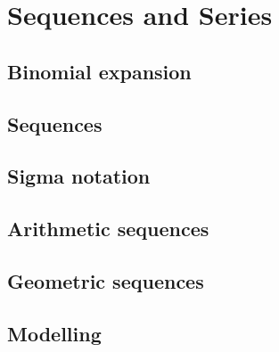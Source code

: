 \chapter{Sequences and Series}

\section{Binomial expansion}
\section{Sequences}
\section{Sigma notation}
\section{Arithmetic sequences}
\section{Geometric sequences}
\section{Modelling}